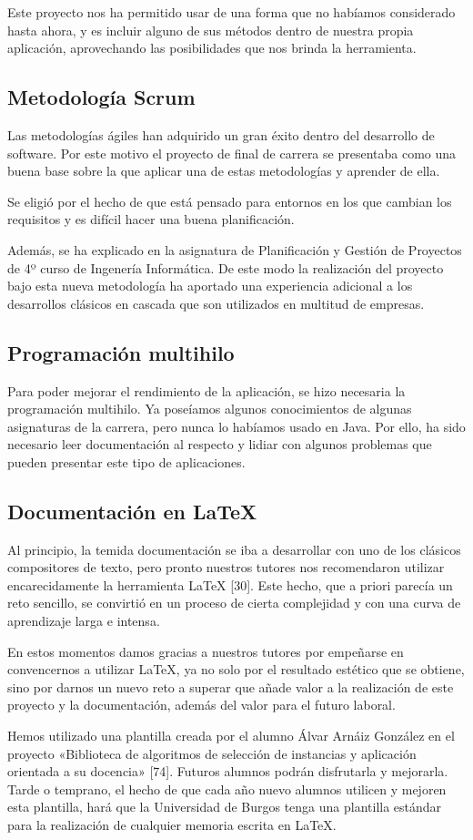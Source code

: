 Este proyecto nos ha permitido usar \weka{} de una forma que no habíamos considerado hasta ahora, y es incluir alguno de sus métodos dentro de nuestra propia aplicación, aprovechando las posibilidades que nos brinda la herramienta.

\subsection{Metodología Scrum}
Las metodologías ágiles han adquirido un gran éxito dentro del desarrollo de software. Por este motivo el proyecto de final de carrera se presentaba como una buena base sobre la que aplicar una de estas metodologías y aprender de ella.

Se eligió \scrum{} por el hecho de que está pensado para entornos en los que cambian los requisitos y es difícil hacer una buena planificación.

Además, \scrum{} se ha explicado en la asignatura de Planificación y Gestión de Proyectos de 4º curso de Ingenería Informática. De este modo la realización del proyecto bajo esta nueva metodología ha aportado una experiencia adicional a los desarrollos clásicos en cascada que son utilizados en multitud de empresas.

\subsection{Programación multihilo}
Para poder mejorar el rendimiento de la aplicación, se hizo necesaria la programación multihilo. Ya poseíamos algunos conocimientos de algunas asignaturas de la carrera, pero nunca lo habíamos usado en Java. Por ello, ha sido necesario leer documentación al respecto y lidiar con algunos problemas que pueden presentar este tipo de aplicaciones.

\subsection{Documentación en \LaTeX{}}
Al principio, la temida documentación se iba a desarrollar con uno de los clásicos compositores
de texto, pero pronto nuestros tutores nos recomendaron utilizar encarecidamente la herramienta
\LaTeX{} [30]. Este hecho, que a priori parecía un reto sencillo, se convirtió en un proceso de cierta
complejidad y con una curva de aprendizaje larga e intensa.

En estos momentos damos gracias a nuestros tutores por empeñarse en convencernos a utilizar
\LaTeX{}, ya no solo por el resultado estético que se obtiene, sino por darnos un nuevo reto a superar
que añade valor a la realización de este proyecto y la documentación, además del valor para el
futuro laboral.

Hemos utilizado una plantilla creada por el alumno Álvar Arnáiz González en el proyecto «Biblioteca
de algoritmos de selección de instancias y aplicación orientada a su docencia» [74]. Futuros
alumnos podrán disfrutarla y mejorarla. Tarde o temprano, el hecho de que cada año nuevo
alumnos utilicen y mejoren esta plantilla, hará que la Universidad de Burgos tenga una plantilla
estándar para la realización de cualquier memoria escrita en \LaTeX{}.
